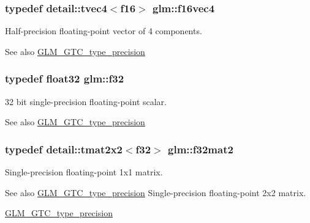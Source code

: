 \subsubsection[{f16vec4}]{\setlength{\rightskip}{0pt plus 5cm}typedef detail\+::tvec4$<$f16$>$ {\bf glm\+::f16vec4}}\label{group__gtc__type__precision_gabf914b5cb8fad08b5897f53e7560a2de}
Half-\/precision floating-\/point vector of 4 components. \begin{DoxySeeAlso}{See also}
\hyperlink{group__gtc__type__precision}{G\+L\+M\+\_\+\+G\+T\+C\+\_\+type\+\_\+precision} 
\end{DoxySeeAlso}
\hypertarget{group__gtc__type__precision_ga0ec999b57f5330d9021256e96038df04}{}
\subsubsection[{f32}]{\setlength{\rightskip}{0pt plus 5cm}typedef float32 {\bf glm\+::f32}}\label{group__gtc__type__precision_ga0ec999b57f5330d9021256e96038df04}
32 bit single-\/precision floating-\/point scalar. \begin{DoxySeeAlso}{See also}
\hyperlink{group__gtc__type__precision}{G\+L\+M\+\_\+\+G\+T\+C\+\_\+type\+\_\+precision} 
\end{DoxySeeAlso}
\hypertarget{group__gtc__type__precision_ga82ecea513745584fb481d18fc9fa5e0a}{}
\subsubsection[{f32mat2}]{\setlength{\rightskip}{0pt plus 5cm}typedef detail\+::tmat2x2$<$f32$>$ {\bf glm\+::f32mat2}}\label{group__gtc__type__precision_ga82ecea513745584fb481d18fc9fa5e0a}
Single-\/precision floating-\/point 1x1 matrix. \begin{DoxySeeAlso}{See also}
\hyperlink{group__gtc__type__precision}{G\+L\+M\+\_\+\+G\+T\+C\+\_\+type\+\_\+precision} Single-\/precision floating-\/point 2x2 matrix. 

\hyperlink{group__gtc__type__precision}{G\+L\+M\+\_\+\+G\+T\+C\+\_\+type\+\_\+precision} 
\end{DoxySeeAlso}
\hypertarget{group__gtc__type__precision_ga0cd7f055e4070140afba92b7fbff1e04}{}
